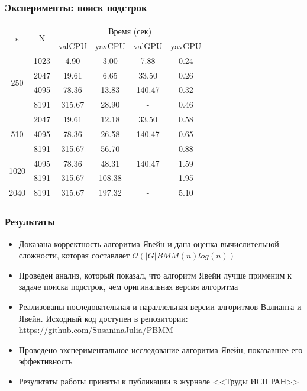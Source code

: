 \documentclass{beamer}
\begin{document}
\begin{frame}
\frametitle{Эксперименты: поиск подстрок}
    
    \begin{table}
    
    \begin{center}
    \label{tbl3}
        \begin{tabular}{ ||c||c||c|c||c|c|| } 
        \hline
        \multirow{2}{*}{s}& \multirow{2}{*}{N} & \multicolumn{4}{c||}{Время (сек)}\\
        & & valCPU & yavCPU & valGPU & yavGPU \\
        \hline
        \multirow{4}{*}{250} & 1023 & 4.90 & 3.00 & 7.88 & 0.24 \\ 
        & 2047 & 19.61 & 6.65 & 33.50 & 0.26\\ 
        & 4095 & 78.36 & 13.83 & 140.47 & 0.32\\ 
        & 8191 & 315.67 & 28.90 & - & 0.46\\ 
        \hline
        \multirow{3}{*}{510} & 2047 & 19.61 & 12.18 & 33.50 & 0.58\\
        & 4095 & 78.36 & 26.58 & 140.47 & 0.65\\
        & 8191 & 315.67 & 56.70 & -  & 0.88\\ 
        \hline
        \multirow{2}{*}{1020} & 4095 & 78.36 & 48.31 & 140.47 & 1.59 \\
        & 8191 & 315.67 & 108.38 & - & 1.95\\ 
        \hline
        2040 & 8191 & 315.67 & 197.32 & - & 5.10\\ 
        \hline
        \end{tabular}
    \end{center}
    
    \end{table}

\end{frame}



\begin{frame}
  \transwipe[direction=90]
  \frametitle{Результаты}
  \begin{itemize}
	\item Доказана корректность алгоритма Явейн и дана оценка вычислительной сложности, которая составляет $\mathcal{O}(|G|BMM(n)log(n))$
	\item Проведен анализ, который показал, что алгоритм Явейн лучше применим к задаче поиска подстрок, чем оригинальная версия алгоритма
	\item Реализованы последовательная и параллельная версии алгоритмов Валианта и Явейн. Исходный код доступен в репозитории: https://github.com/SusaninaJulia/PBMM
	\item Проведено экспериментальное исследование алгоритма Явейн, показавшее его эффективность  
	\item Результаты работы приняты к публикации в журнале <<Труды ИСП РАН>>
    \end{itemize}
\end{frame}
\end{document}
